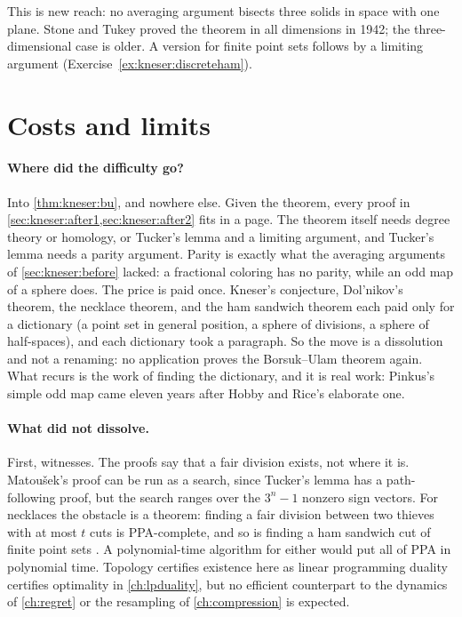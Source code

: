 \begin{refsection}
This is new reach: no averaging argument bisects three solids in space with one plane. Stone and Tukey proved the theorem in all dimensions in 1942; the three-dimensional case is older. A version for finite point sets follows by a limiting argument (Exercise~\ref{ex:kneser:discreteham}).

\section{Costs and limits}\label{sec:kneser:costs}

\paragraph{Where did the difficulty go?} Into \cref{thm:kneser:bu}, and nowhere else. Given the theorem, every proof in \cref{sec:kneser:after1,sec:kneser:after2} fits in a page. The theorem itself needs degree theory or homology, or Tucker's lemma and a limiting argument, and Tucker's lemma needs a parity argument. Parity is exactly what the averaging arguments of \cref{sec:kneser:before} lacked: a fractional coloring has no parity, while an odd map of a sphere does. The price is paid once. Kneser's conjecture, Dol'nikov's theorem, the necklace theorem, and the ham sandwich theorem each paid only for a dictionary (a point set in general position, a sphere of divisions, a sphere of half-spaces), and each dictionary took a paragraph. So the move is a dissolution and not a renaming: no application proves the Borsuk--Ulam theorem again. What recurs is the work of finding the dictionary, and it is real work: Pinkus's simple odd map came eleven years after Hobby and Rice's elaborate one.

\paragraph{What did not dissolve.} First, witnesses. The proofs say that a fair division exists, not where it is. Matoušek's proof can be run as a search, since Tucker's lemma has a path-following proof, but the search ranges over the $3^n-1$ nonzero sign vectors. For necklaces the obstacle is a theorem: finding a fair division between two thieves with at most $t$ cuts is PPA-complete, and so is finding a ham sandwich cut of finite point sets \parencite{FilosRatsikasGoldberg2019}. A polynomial-time algorithm for either would put all of PPA in polynomial time. Topology certifies existence here as linear programming duality certifies optimality in \cref{ch:lpduality}, but no efficient counterpart to the dynamics of \cref{ch:regret} or the resampling of \cref{ch:compression} is expected.


\end{refsection}
